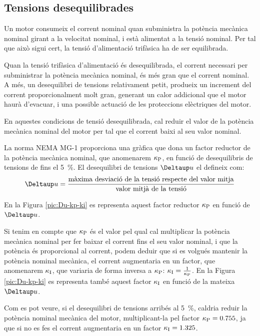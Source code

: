 \subsection{Tensions desequilibrades}

Un motor consumeix el corrent nominal quan subministra la potència mecànica nominal girant a la velocitat nominal, i està alimentat a la tensió nominal. Per tal que això sigui cert, la tensió d'alimentació trifàsica ha de ser equilibrada.

Quan la tensió trifàsica d'alimentació és desequilibrada, el corrent necessari per subministrar la potència mecànica nominal, és més gran que el corrent nominal. A més, un desequilibri de tensions relativament petit, produeix un increment del corrent proporcionalment molt gran, generant un  calor addicional que el motor haurà d'evacuar, i una possible actuació de les proteccions elèctriques del motor.

En aquestes condicions de tensió desequilibrada, cal reduir el valor de la potència mecànica nominal del motor per tal que el corrent baixi al seu valor nominal.

La norma NEMA MG-1 proporciona una gràfica que dona un factor reductor de la potència mecànica nominal, que anomenarem $\kappa_\mathrm{P}$, en funció de desequilibris de tensions de fins el \SI{5}{\%}. El desequilibri de tensions $\Deltaup u$ el defineix com:
\[
    \Deltaup u = \frac{\text{màxima desviació de la tensió respecte del valor mitja}}{\text{valor mitjà de la tensió}}
\]

En la Figura \vref{pic:Du-kp-ki} es representa aquest factor reductor $\kappa_\mathrm{P}$ en funció de $\Deltaup u$.

Si tenim en compte que  $\kappa_\mathrm{P}$ és el valor pel qual cal multiplicar la potència mecànica nominal per fer baixar el corrent fins el seu valor nominal, i que la potència és proporcional al corrent, podem deduir que si es volgués mantenir la potència nominal mecànica, el corrent augmentaria en un factor, que anomenarem $\kappa_\mathrm{I}$, que variaria de forma inversa a $\kappa_\mathrm{P}$: $\kappa_\mathrm{I}=\frac{1}{\kappa_\mathrm{P}}$. En la Figura \vref{pic:Du-kp-ki} es representa també aquest factor $\kappa_\mathrm{I}$ en funció de la mateixa $\Deltaup u$.

Com es pot veure, si el desequilibri de tensions arribés al \SI{5}{\%}, caldria reduir la potència nominal mecànica del motor, multiplicant-la pel factor  $\kappa_\mathrm{P}= \num{0,755}$, ja que si no es fes el corrent augmentaria en
un factor $\kappa_\mathrm{I}= \num{1,325}$.

